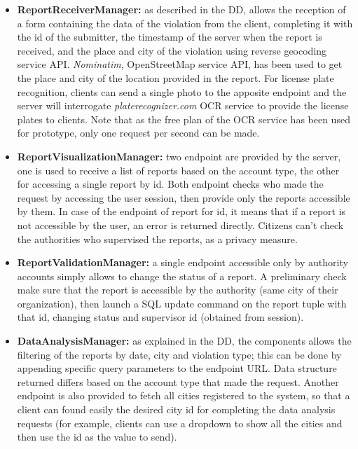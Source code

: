 \begin{itemize}
	\item \textbf{ReportReceiverManager:} as described in the DD, allows the reception of a form containing the data of the violation from the client, completing it with the id of the submitter, the timestamp of the server when the report is received, and the place and city of the violation using reverse geocoding service API. \textit{Nominatim}, OpenStreetMap service API, has been used to get the place and city of the location provided in the report. For license plate recognition, clients can send a single photo to the apposite endpoint and the server will interrogate \textit{platerecognizer.com} OCR service to provide the license plates to clients. Note that as the free plan of the OCR service has been used for prototype, only one request per second can be made.
	
	\item \textbf{ReportVisualizationManager:} two endpoint are provided by the server, one is used to receive a list of reports based on the account type, the other for accessing a single report by id. Both endpoint checks who made the request by accessing the user session, then provide only the reports accessible by them. In case of the endpoint of report for id, it means that if a report is not accessible by the user, an error is returned directly. Citizens can't check the authorities who supervised the reports, as a privacy measure.
	
	\item \textbf{ReportValidationManager:} a single endpoint accessible only by authority accounts simply allows to change the status of a report. A preliminary check make sure that the report is accessible by the authority (same city of their organization), then launch a SQL update command on the report tuple with that id, changing status and supervisor id (obtained from session).
	
	\item \textbf{DataAnalysisManager:} as explained in the DD, the components allows the filtering of the reports by date, city and violation type; this can be done by appending specific query parameters to the endpoint URL. Data structure returned differs based on the account type that made the request. Another endpoint is also provided to fetch all cities registered to the system, so that a client can found easily the desired city id for completing the data analysis requests (for example, clients can use a dropdown to show all the cities and then use the id as the value to send).
\end{itemize}